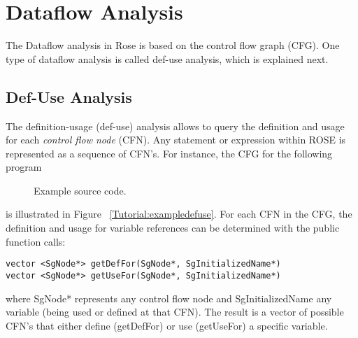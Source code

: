 \chapter{Dataflow Analysis}

The Dataflow analysis in Rose is based on the control flow graph (CFG).
One type of dataflow analysis is called def-use analysis, which is explained next.

\section{Def-Use Analysis}

The definition-usage (def-use) analysis allows to query the definition
and usage for each \emph{control flow node} (CFN).
Any statement or expression within ROSE is represented as a sequence of CFN's.
For instance, the CFG for the following program



\begin{figure}[!h]
{\indent
{\mySmallFontSize


\begin{latexonly}
   
\end{latexonly}

\begin{htmlonly}
   
\end{htmlonly}

}
}
\caption{Example source code.}
\label{Tutorial:exampledefuseCode}
\end{figure}

is illustrated in Figure ~\ref{Tutorial:exampledefuse}.
For each CFN in the CFG, the definition and usage for 
variable references can be determined with the public function calls:

\begin{verbatim}
vector <SgNode*> getDefFor(SgNode*, SgInitializedName*)
vector <SgNode*> getUseFor(SgNode*, SgInitializedName*)
\end{verbatim}

where SgNode* represents any control flow node and SgInitializedName any variable (being
used or defined at that CFN). The result is a vector of possible CFN's that either
define (getDefFor) or use (getUseFor) a specific variable.

